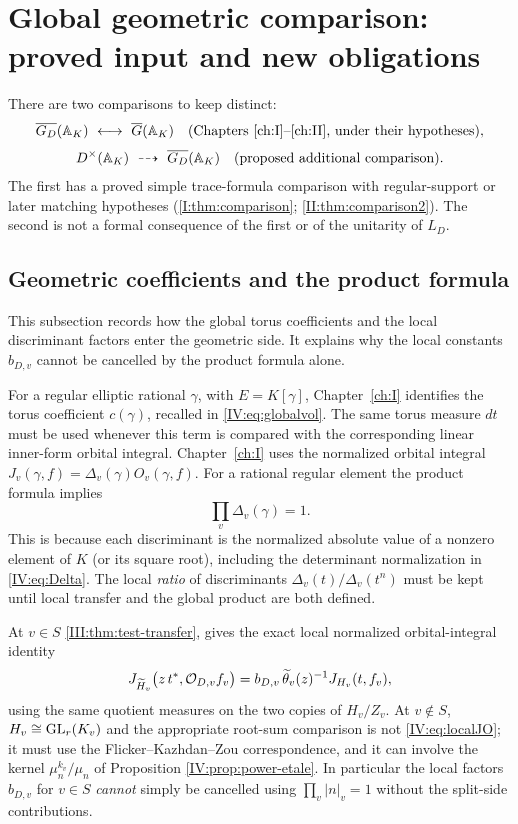 \section{Global geometric comparison: proved input and new obligations}\label{IV:sec:geometric}
There are two comparisons to keep distinct:
\begin{equation}\label{IV:eq:twocomparisons}
 \begin{gathered}
 \overline{G_D}(\mathbb A_K)\ \longleftrightarrow\ \overline G(\mathbb A_K)
 \quad\text{(Chapters~\ref{ch:I}--\ref{ch:II}, under their hypotheses)},\\[3pt]
 D^\times(\mathbb A_K)\ \dashrightarrow\ \overline{G_D}(\mathbb A_K)
 \quad\text{(proposed additional comparison)}.
 \end{gathered}
\end{equation}
The first has a proved simple trace-formula comparison with
regular-support or later matching hypotheses (\cref{I:thm:comparison};
\cref{II:thm:comparison2}).
The second is not a formal consequence of the first or of the
unitarity of $L_D$.

\subsection{Geometric coefficients and the product formula}
This subsection records how the global torus coefficients and the local discriminant factors enter the geometric side. It explains why the local constants $b_{D,v}$ cannot be cancelled by the product formula alone.

For a regular elliptic rational $\gamma$, with $E=K[\gamma]$,
Chapter~\ref{ch:I} identifies the torus coefficient $c(\gamma)$, recalled in
\eqref{IV:eq:globalvol}. The same torus measure $dt$ must be used
whenever this term is compared with the corresponding linear
inner-form orbital integral.
Chapter~\ref{ch:I} uses the normalized orbital integral
$J_v(\gamma,f)=\Delta_v(\gamma)O_v(\gamma,f)$.
For a rational regular element the product formula implies
\begin{equation}\label{IV:eq:discprod}
 \prod_v\Delta_v(\gamma)=1.
\end{equation}
This is because each discriminant is the normalized absolute
value of a nonzero element of $K$ (or its square root), including
the determinant normalization in \eqref{IV:eq:Delta}.
The local \emph{ratio} of discriminants
$\Delta_v(t)/\Delta_v(t^n)$ must be kept until local transfer
and the global product are both defined.

At $v\in S$ \cref{III:thm:test-transfer}, gives the exact local
normalized orbital-integral identity
\begin{equation}\label{IV:eq:localJO}
 J_{\widetilde H_v}\bigl(z\,t^*,\mathcal O_{D,v}f_v\bigr)
 =b_{D,v}\,\widetilde\theta_v(z)^{-1}
 J_{H_v}(t,f_v),
\end{equation}
using the same quotient measures on the two copies of $H_v/Z_v$.
At $v\notin S$, $H_v\cong\operatorname{GL}_r(K_v)$ and the appropriate
root-sum comparison is not \eqref{IV:eq:localJO}; it must use
the Flicker--Kazhdan--Zou correspondence, and it can involve the kernel
$\mu_n^{k_v}/\mu_n$ of Proposition \ref{IV:prop:power-etale}.
In particular the local factors $b_{D,v}$ for $v\in S$
\emph{cannot} simply be cancelled using
$\prod_v|n|_v=1$ without the split-side contributions.

